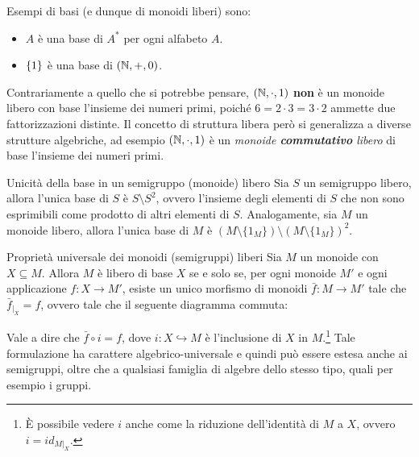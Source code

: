 \begin{example}[]{}
  Esempi di basi (e dunque di monoidi liberi) sono:
  \begin{itemize}
    \item \(A\) è una base di \(A^*\) per ogni alfabeto \(A\).
    \item \(\set{1}\) è una base di \((\mathbb{N}, +, 0)\).
  \end{itemize}
  Contrariamente a quello che si potrebbe pensare, \((\mathbb{N}, \cdot, 1)\) \textbf{non} è un monoide libero con base l'insieme dei numeri primi, poiché \(6 = 2 \cdot 3 = 3 \cdot 2\) ammette due fattorizzazioni distinte.
  Il concetto di struttura libera però si generalizza a diverse strutture algebriche, ad esempio \((\mathbb{N}, \cdot, 1)\) è un \emph{monoide \textbf{commutativo} libero} di base l'insieme dei numeri primi.
\end{example}

\begin{proposition}{Unicità della base in un semigruppo (monoide) libero}
  Sia \(S\) un semigruppo libero, allora l'unica base di \(S\) è \(S \setminus S^2\), ovvero l'insieme degli elementi di \(S\) che non sono esprimibili come prodotto di altri elementi di \(S\).
  Analogamente, sia \(M\) un monoide libero, allora l'unica base di \(M\) è \((M\setminus \{1_M\}) \setminus {(M\setminus \{1_M\})}^2\).
\end{proposition}

\begin{theorem}{Proprietà universale dei monoidi (semigruppi) liberi}
  Sia \(M\) un monoide con \(X \subseteq M\). Allora \(M\) è libero di base \(X\) se e solo se, per ogni monoide \(M'\) e ogni applicazione \(f: X \to M'\), esiste un unico morfismo di monoidi \(\bar{f}: M \to M'\) tale che \(\bar{f}_{|_X} = f\), ovvero tale che il seguente diagramma commuta:
  \begin{center}
  \end{center}
  Vale a dire che \(\bar{f} \circ i = f\), dove \(i: X \hookrightarrow M\) è l'inclusione di \(X\) in \(M\).\footnote{È possibile vedere \(i\) anche come la riduzione dell'identità di \(M\) a \(X\), ovvero \(i = id_{M|_X}\).}
  Tale formulazione ha carattere algebrico-universale e quindi può essere estesa anche ai semigruppi, oltre che a qualsiasi famiglia di algebre dello stesso tipo, quali per esempio i gruppi.
\end{theorem}

